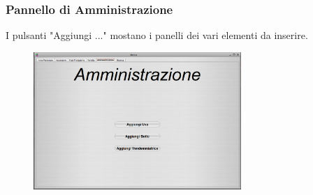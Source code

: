 \documentclass{article}
\begin{document}
\subsubsection{Pannello di Amministrazione}
I pulsanti "Aggiungi ..." mostano i panelli dei vari elementi da inserire.\\
\begin{figure}[htbp]
\centering
\includegraphics[width=0.7\textwidth]{img/panel_amministrazione_init.png}
\end{figure}\\
\end{document}
